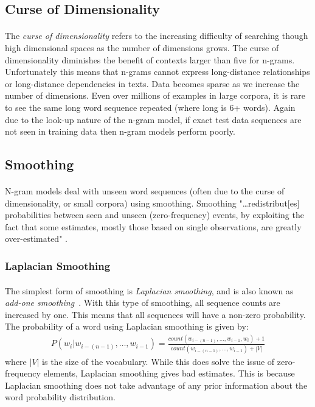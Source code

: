 \subsection{Curse of Dimensionality}
\paragraph{}
The \emph{curse of dimensionality} refers to the increasing difficulty of searching though high dimensional spaces as the number of dimensions grows. The curse of dimensionality diminishes the benefit of contexts larger than five for n-grams. Unfortunately this means that n-grams cannot express long-distance relationships or long-distance dependencies in texts. Data becomes sparse as we increase the number of dimensions. Even over millions of examples in large corpora, it is rare to see the same long word sequence repeated (where long is 6+ words). Again due to the look-up nature of the n-gram model, if exact test data sequences are not seen in training data then n-gram models perform poorly.
\subsection{Smoothing}
\paragraph{}
N-gram models deal with unseen word sequences (often due to the curse of dimensionality, or small corpora) using smoothing. Smoothing "\dots redistribut[es] probabilities between seen and unseen (zero-frequency) events, by
exploiting the fact that some estimates, mostly those based on single observations, are greatly over-estimated" \cite[pg. 16]{Mikolov2012}.
\subsubsection{Laplacian Smoothing}
\paragraph{}
The simplest form of smoothing is \emph{Laplacian smoothing}, and is also known as \emph{add-one smoothing}~\cite{Jurafsky2009}. With this type of smoothing, all sequence counts are increased by one. This means that all sequences will have a non-zero probability. The probability of a word using Laplacian smoothing is given by:
\begin{align}
P(w_i | w_{i-(n-1)},\dots, w_{i-1}) = \frac{count(w_{i-(n-1)},\dots,w_{i-1},w_i)+1}{count(w_{i-(n-1)},\dots,w_{i-1})+|V|}
\end{align}
where $|V|$ is the size of the vocabulary. While this does solve the issue of zero-frequency elements, Laplacian smoothing gives bad estimates. This is because Laplacian smoothing does not take advantage of any prior information about the word probability distribution.
